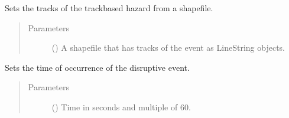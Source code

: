 \documentclass[letterpaper,10pt,english]{sphinxmanual}
\begin{document}
\begin{fulllineitems}
\begin{fulllineitems}
\begin{quote}
\begin{description}
\end{description}\end{quote}

\end{fulllineitems}


\begin{fulllineitems}
\label{\detokenize{apidoc:dreaminsg_integrated_model.src.hazard_initiator.TrackDisruption.set_hazard_tracks}}
\sphinxAtStartPar
Sets the tracks of the track\sphinxhyphen{}based hazard from a shapefile.
\begin{quote}\begin{description}
\item[{Parameters}] \leavevmode
\sphinxAtStartPar
{} () \textendash{} A shapefile that has tracks of the event as LineString objects.

\end{description}\end{quote}

\end{fulllineitems}


\begin{fulllineitems}
\label{\detokenize{apidoc:dreaminsg_integrated_model.src.hazard_initiator.TrackDisruption.set_time_of_occurrence}}
\sphinxAtStartPar
Sets the time of occurrence of the disruptive event.
\begin{quote}\begin{description}
\item[{Parameters}] \leavevmode
\sphinxAtStartPar
{} () \textendash{} Time in seconds and multiple of 60.

\end{description}\end{quote}

\end{fulllineitems}


\end{fulllineitems}
\end{document}
